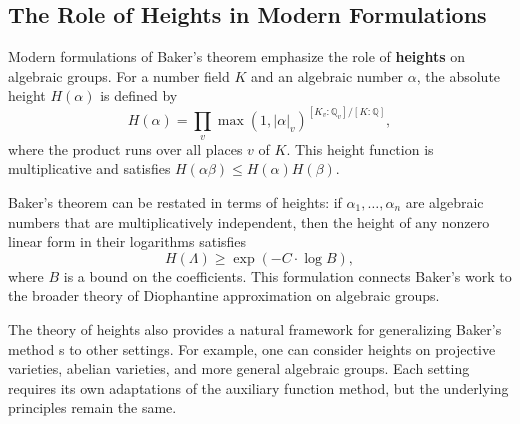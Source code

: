 \subsection*{The Role of Heights in Modern Formulations}

Modern formulations of Baker's theorem emphasize the role of \textbf{heights} on algebraic groups. For a number field $K$ and an algebraic number $\alpha$, the absolute height $H(\alpha)$ is defined by
\[
H(\alpha) = \prod_v \max(1, |\alpha|_v)^{[K_v:\mathbb{Q}_v]/[K:\mathbb{Q}]},
\]
where the product runs over all places $v$ of $K$. This height function is multiplicative and satisfies $H(\alpha\beta) \leq H(\alpha)H(\beta)$.

Baker's theorem can be restated in terms of heights: if $\alpha_1, \ldots, \alpha_n$ are algebraic numbers that are multiplicatively independent, then the height of any nonzero linear form in their logarithms satisfies
\[
H(\Lambda) \geq \exp(-C \cdot \log B),
\]
where $B$ is a bound on the coefficients. This formulation connects Baker's work to the broader theory of Diophantine approximation on algebraic groups.

The theory of heights also provides a natural framework for generalizing Baker's method \cite{baker1966}s to other settings. For example, one can consider heights on projective varieties, abelian varieties, and more general algebraic groups. Each setting requires its own adaptations of the auxiliary function method, but the underlying principles remain the same.
